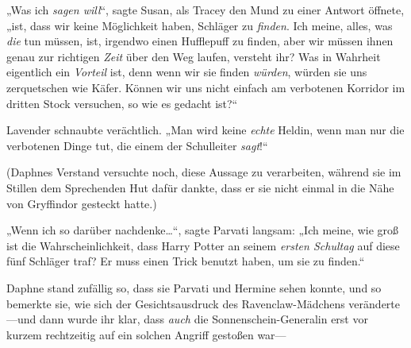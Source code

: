 „Was ich \emph{sagen will}“, sagte Susan, als Tracey den Mund zu einer Antwort öffnete, „ist, dass wir keine Möglichkeit haben, Schläger zu \emph{finden}. Ich meine, alles, was \emph{die} tun müssen, ist, irgendwo einen Hufflepuff zu finden, aber wir müssen ihnen genau zur richtigen \emph{Zeit} über den Weg laufen, versteht ihr? Was in Wahrheit eigentlich ein \emph{Vorteil} ist, denn wenn wir sie finden \emph{würden}, würden sie uns zerquetschen wie Käfer. Können wir uns nicht einfach am verbotenen Korridor im dritten Stock versuchen, so wie es gedacht ist?“

Lavender schnaubte verächtlich. „Man wird keine \emph{echte} Heldin, wenn man nur die verbotenen Dinge tut, die einem der Schulleiter \emph{sagt}!“

(Daphnes Verstand versuchte noch, diese Aussage zu verarbeiten, während sie im Stillen dem Sprechenden Hut dafür dankte, dass er sie nicht einmal in die Nähe von Gryffindor gesteckt hatte.)

„Wenn ich so darüber nachdenke…“, sagte Parvati langsam: „Ich meine, wie groß ist die Wahrscheinlichkeit, dass Harry Potter an seinem \emph{ersten Schultag} auf diese fünf Schläger traf? Er muss einen Trick benutzt haben, um sie zu finden.“

Daphne stand zufällig so, dass sie Parvati und Hermine sehen konnte, und so bemerkte sie, wie sich der Gesichtsausdruck des Ravenclaw-Mädchens veränderte—und dann wurde ihr klar, dass \emph{auch} die Sonnenschein-Generalin erst vor kurzem rechtzeitig auf ein solchen Angriff gestoßen war—

